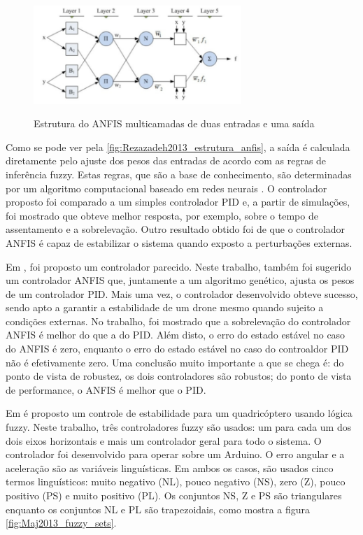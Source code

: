 \begin{figure}[!htb]
    \centering
    \caption{Estrutura do ANFIS multicamadas de duas entradas e uma saída}
    \includegraphics[width=0.7\textwidth]{./04-figuras/Rezazadeh2013_estrutura_anfis}
    \label{fig:Rezazadeh2013_estrutura_anfis}
\end{figure}

Como se pode ver pela \autoref{fig:Rezazadeh2013_estrutura_anfis}, a saída é calculada diretamente pelo ajuste dos pesos das entradas de acordo com as regras de inferência fuzzy. Estas regras, que são a base de conhecimento, são determinadas por um algoritmo computacional baseado em redes neurais \cite{Rezazadeh2013}. O controlador proposto foi comparado a um simples controlador PID e, a partir de simulações, foi mostrado que obteve melhor resposta, por exemplo, sobre o tempo de assentamento e a sobrelevação. Outro resultado obtido foi de que o controlador ANFIS é capaz de estabilizar o sistema quando exposto a perturbações externas.

Em \cite{Mahfouz2013}, foi proposto um controlador parecido. Neste trabalho, também foi sugerido um controlador ANFIS que, juntamente a um algoritmo genético, ajusta os pesos de um controlador PID. Mais uma vez, o controlador desenvolvido obteve sucesso, sendo apto a garantir a estabilidade de um drone mesmo quando sujeito a condições externas. No trabalho, foi mostrado que a sobrelevação do controlador ANFIS é melhor do que a do PID. Além disto, o erro do estado estável no caso do ANFIS é zero, enquanto o erro do estado estável no caso do controaldor PID não é efetivamente zero. Uma conclusão muito importante a que se chega é: do ponto de vista de robustez, os dois controladores são robustos; do ponto de vista de performance, o ANFIS é melhor que o PID.


Em \cite{Maj2013} é proposto um controle de estabilidade para um quadricóptero usando lógica fuzzy. Neste trabalho, três controladores fuzzy são usados: um para cada um dos dois eixos horizontais e mais um controlador geral para todo o sistema. O controlador foi desenvolvido para operar sobre um Arduino. O erro angular e a aceleração são as variáveis linguísticas. Em ambos os casos, são usados cinco termos linguísticos: muito negativo (NL), pouco negativo (NS), zero (Z), pouco positivo (PS) e muito positivo (PL). Os conjuntos NS, Z e PS são triangulares enquanto os conjuntos NL e PL são trapezoidais, como mostra a figura \autoref{fig:Maj2013_fuzzy_sets}. 

